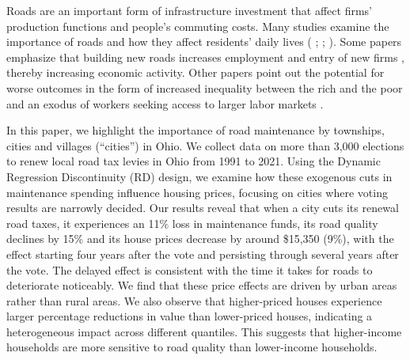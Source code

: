 Roads are an important form of infrastructure investment that affect firms’ production functions and people’s commuting costs. Many studies examine the importance of roads and how they affect residents' daily lives ( \citeyear{currier2023};  \citeyear{adukia2020};  \citeyear{asher2020}). Some papers emphasize that building new roads increases employment and entry of new firms \citep{gibbons2019new}, thereby increasing economic activity. Other papers point out the potential for worse outcomes in the form of increased inequality between the rich and the poor \citep{hettige2006} and an exodus of workers seeking access to larger labor markets \citep{asher2020}.  
 
In this paper, we highlight the importance of road maintenance by townships, cities and villages (``cities'') in Ohio. We collect data on more than 3,000 elections to renew local road tax levies in Ohio from 1991 to 2021. Using the Dynamic Regression Discontinuity (RD) design, we examine how these exogenous cuts in maintenance spending influence housing prices, focusing on cities where voting results are narrowly decided. Our results reveal that when a city cuts its renewal road taxes, it experiences an 11\% loss in maintenance funds, its road quality declines by 15\% and its house prices decrease by around \$15,350 (9\%), with the effect starting four years after the vote and persisting through several years after the vote. The delayed effect is consistent with the time it takes for roads to deteriorate noticeably. We find that these price effects are driven by urban areas rather than rural areas. We also observe that higher-priced houses experience larger percentage reductions in value than lower-priced houses, indicating a heterogeneous impact across different quantiles. This suggests that higher-income households are more sensitive to road quality than lower-income households. 


